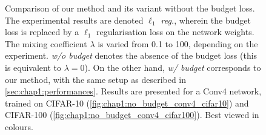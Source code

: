 \begin{figure}
  \centering
  \caption{ Comparison of our method and its variant without the budget loss.
    The experimental results are denoted \emph{$\ell_1$ reg.}, wherein the budget
    loss is replaced by a $\ell_1$ regularisation loss on the network weights. The
    mixing coefficient $\lambda$ is varied from 0.1 to 100, depending on the
    experiment. \emph{w/o budget} denotes the absence of the budget loss (this
    is equivalent to $\lambda = 0$). On the other hand, \emph{w/ budget}
    corresponds to our method, with the same setup as described in
    \cref{sec:chap1:performances}. Results are presented for a Conv4 network,
    trained on CIFAR-10 (\cref{fig:chap1:no_budget_conv4_cifar10}) and CIFAR-100
    (\cref{fig:chap1:no_budget_conv4_cifar100}). Best viewed in colours.}
  \label{fig:chap1:no_budget_conv4}
\end{figure}



